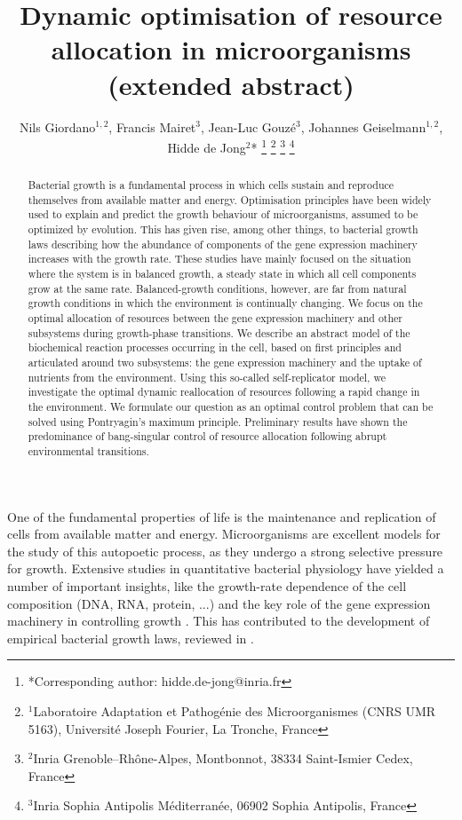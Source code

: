\documentclass[10pt, conference]{ieeeconf}      %
\title{\LARGE \bf
Dynamic optimisation of resource allocation in microorganisms (extended abstract)
}
\author{Nils Giordano$^{1,2}$, Francis Mairet$^{3}$, Jean-Luc Gouzé$^{3}$, Johannes Geiselmann$^{1,2}$, Hidde de Jong$^{2}$*%
\thanks{*Corresponding author: hidde.de-jong@inria.fr}%
\thanks{$^{1}$Laboratoire Adaptation et Pathog\'enie des Microorganismes (CNRS UMR 5163),
Universit\'e Joseph Fourier,
La Tronche, France}
\thanks{$^{2}$Inria Grenoble--Rh\^one-Alpes, Montbonnot, 38334 Saint-Ismier Cedex, France}
\thanks{$^{3}$Inria Sophia Antipolis M\'editerran\'ee, 06902 Sophia Antipolis, France}
}
\begin{document}
\maketitle
\thispagestyle{empty}
\pagestyle{empty}
\begin{abstract}

Bacterial growth is a fundamental process in which cells sustain and reproduce themselves from available matter and energy.
Optimisation principles have been widely used to explain and predict the growth behaviour of microorganisms, assumed to be optimized by evolution.
This has given rise, among other things, to bacterial growth laws describing how the abundance of components of the gene expression machinery increases with the growth rate. These studies have mainly focused on the situation where the system is in balanced growth, a steady state in which all cell components grow at the same rate.
Balanced-growth conditions, however, are far from natural growth conditions in which the environment is continually changing.
We focus on the optimal allocation of resources between the gene expression machinery and other subsystems during growth-phase transitions.
We describe an abstract model of the biochemical reaction processes occurring in the cell, based on first principles and articulated around two subsystems: the gene expression machinery and the uptake of nutrients from the environment.
Using this so-called self-replicator model, we investigate the optimal dynamic reallocation of resources following a rapid change in the environment.
We formulate our question as an optimal control problem that can be solved using Pontryagin's maximum principle.
Preliminary results have shown the predominance of bang-singular control of resource allocation following abrupt environmental transitions.
\end{abstract}

One of the fundamental properties of life is the maintenance and replication of cells from available matter and energy.
Microorganisms are excellent models for the study of this autopoetic process, as they undergo a strong selective pressure for growth.
Extensive studies in quantitative bacterial physiology have yielded a number of important insights, like the growth-rate dependence of the cell composition (DNA, RNA, protein, ...) and the key role of the gene expression machinery in controlling growth \cite{scott_interdependence_2010,bremer_modulation_1996,maaloe_control_1966}.
This has contributed to the development of empirical bacterial growth laws, reviewed in \cite{scott_bacterial_2011}.
\end{document}
